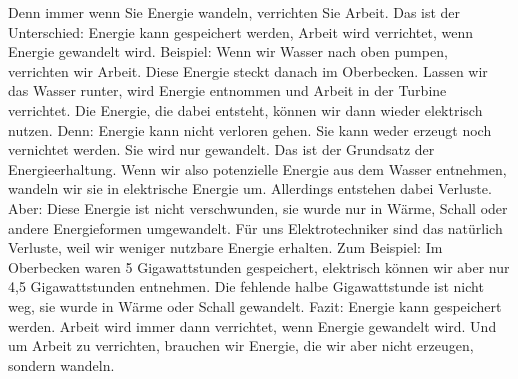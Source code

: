 \begin{frame}
{			Denn immer wenn Sie Energie wandeln, verrichten Sie Arbeit.
			Das ist der Unterschied:
			Energie kann gespeichert werden, Arbeit wird verrichtet, wenn Energie gewandelt wird.
			Beispiel:
			Wenn wir Wasser nach oben pumpen, verrichten wir Arbeit. Diese Energie steckt danach im Oberbecken.
			Lassen wir das Wasser runter, wird Energie entnommen und Arbeit in der Turbine verrichtet.
			Die Energie, die dabei entsteht, können wir dann wieder elektrisch nutzen.
			Denn: Energie kann nicht verloren gehen. Sie kann weder erzeugt noch vernichtet werden.
			Sie wird nur gewandelt. Das ist der Grundsatz der Energieerhaltung.
			Wenn wir also potenzielle Energie aus dem Wasser entnehmen, wandeln wir sie in elektrische Energie um.
			Allerdings entstehen dabei Verluste. 
			Aber: Diese Energie ist nicht verschwunden, sie wurde nur in Wärme, Schall oder andere Energieformen umgewandelt.
			Für uns Elektrotechniker sind das natürlich Verluste, weil wir weniger nutzbare Energie erhalten.
			Zum Beispiel:
			Im Oberbecken waren 5 Gigawattstunden gespeichert, elektrisch können wir aber nur 4,5 Gigawattstunden entnehmen.
			Die fehlende halbe Gigawattstunde ist nicht weg, sie wurde in Wärme oder Schall gewandelt.
			Fazit:
			Energie kann gespeichert werden.
			Arbeit wird immer dann verrichtet, wenn Energie gewandelt wird.
			Und um Arbeit zu verrichten, brauchen wir Energie, die wir aber nicht erzeugen, sondern wandeln.
		}

	\end{frame}

